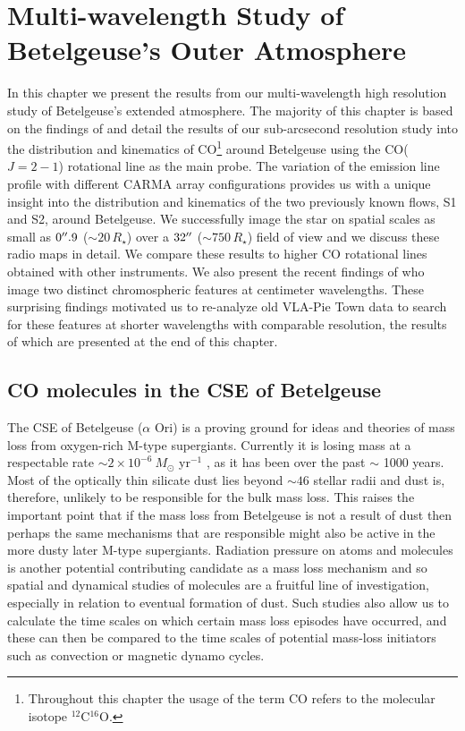 
\chapter{Multi-wavelength Study of Betelgeuse's Outer Atmosphere} \label{chap:5}

In this chapter we present the results from our multi-wavelength high resolution study of Betelgeuse's extended atmosphere. The majority of this chapter is based on the findings of \cite{ogorman_2012} and detail the results of our sub-arcsecond resolution study into the distribution and kinematics of CO\footnote{Throughout this chapter the usage of the term CO refers to the molecular isotope $^{12}$C$^{16}$O.} around Betelgeuse using the CO($J=2-1$) rotational line as the main probe. The variation of the emission line profile with different CARMA array configurations provides us with a unique insight into the distribution and kinematics of the two previously known flows, S1 and S2, around Betelgeuse. We successfully image the star on spatial scales as small as $0^{\prime\prime} .9$ ($\sim 20\,R_{\star}$) over a $32^{\prime\prime}$ ($\sim 750\,R_{\star}$) field of view and we discuss these radio maps in detail. We compare these results to higher CO rotational lines obtained with other instruments. We also present the recent findings of \cite{richards_2013} who image two distinct chromospheric features at centimeter wavelengths. These surprising findings motivated us to re-analyze old VLA-Pie Town data to search for these features at shorter wavelengths with comparable resolution, the results of which are presented at the end of this chapter. 

\section{CO molecules in the CSE of Betelgeuse}
\label{sec:5.1}
The CSE of Betelgeuse ($\alpha$ Ori) is a proving ground for ideas and theories of mass loss from oxygen-rich M-type supergiants. Currently it is losing mass at a respectable rate $\sim 2\times 10^{-6} \ M_{\odot}$ yr${}^{-1}$ \citep{harper_2001}, as it has been over the past $\sim$ 1000 years. Most of the optically thin silicate dust lies beyond $\sim 46$ stellar radii \citep{danchi_1994} and dust is, therefore, unlikely to be responsible for the bulk mass loss. This raises the important point that if the mass loss from Betelgeuse is not a result of dust then perhaps the same mechanisms that are responsible might also be active in the more dusty later M-type supergiants. Radiation pressure on atoms and molecules is another potential contributing candidate as a mass loss mechanism and so spatial and dynamical studies of molecules are a fruitful line of investigation, especially in relation to eventual formation of dust. Such studies also allow us to calculate the time scales on which certain mass loss episodes have occurred, and these can then be compared to the time scales of potential mass-loss initiators such as convection or magnetic dynamo cycles.

